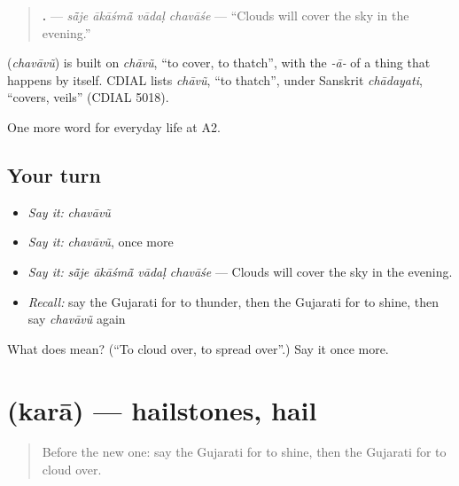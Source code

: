 \begin{quote}
\textbf{   .} — \emph{sā̃je ākāśmā̃ vādaḷ chavāśe} — \textquotedblleft{}Clouds will cover the sky in the evening.\textquotedblright{}
\end{quote}

\begin{cousinweb}
\textbf{} (\emph{chavāvũ}) is built on \emph{chāvũ}, \textquotedblleft{}to cover, to thatch\textquotedblright{}, with the \emph{-ā-} of a thing that happens by itself. CDIAL lists \emph{chāvũ}, \textquotedblleft{}to thatch\textquotedblright{}, under Sanskrit \emph{chādayati}, \textquotedblleft{}covers, veils\textquotedblright{} (CDIAL 5018).
\end{cousinweb}

\begin{grammarlens}[title={What you've built}]
One more word for everyday life at A2.
\end{grammarlens}

\subsection*{Your turn}
\begin{itemize}
\raggedright
  \item \emph{Say it:} \emph{chavāvũ}
  \item \emph{Say it:} \emph{chavāvũ}, once more
  \item \emph{Say it:} \emph{sā̃je ākāśmā̃ vādaḷ chavāśe} — Clouds will cover the sky in the evening.
  \item \emph{Recall:} say the Gujarati for to thunder, then the Gujarati for to shine, then say \emph{chavāvũ} again
\end{itemize}

\begin{tcolorbox}[breakable,colback=teal!4,colframe=teal!35!black,title={Before you move on}]
What does  mean? (\textquotedblleft{}To cloud over, to spread over\textquotedblright{}.) Say it once more.
\end{tcolorbox}
\section[\texorpdfstring{\gu{કરા} (karā)}{કરા (karā)}]{ (karā) — hailstones, hail}

\label{lesson:GU-C219-kara}



\begin{quote}
Before the new one: say the Gujarati for to shine, then the Gujarati for to cloud over.
\end{quote}

